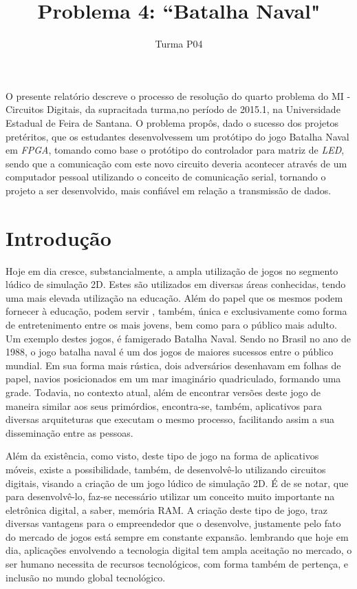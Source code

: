\documentclass[12pt]{article}
\title{Problema 4: ``Batalha Naval"}
\author{Turma P04}
\begin{document}
 

\maketitle

\begin{resumo} 
O presente relatório descreve o processo de resolução do quarto problema do MI - Circuitos Digitais, da supracitada turma,no período de 2015.1, na Universidade Estadual de Feira de Santana. O problema propôs, dado o sucesso dos projetos pretéritos, que os estudantes desenvolvessem um protótipo do jogo Batalha Naval em \textit{FPGA}, tomando como base o  protótipo do controlador para matriz de \textit{LED}, sendo que a comunicação com este novo circuito deveria acontecer através de um computador pessoal utilizando o conceito de comunicação serial, tornando o projeto a ser desenvolvido, mais confiável em relação a transmissão de dados.
\end{resumo}

\section{Introdução}

Hoje em dia cresce, substancialmente, a ampla utilização de jogos no segmento lúdico de simulação 2D. Estes são utilizados em diversas áreas conhecidas, tendo uma mais elevada utilização na educação. Além do papel que os mesmos podem fornecer à educação, podem servir , também, única e exclusivamente como forma de entretenimento entre os mais jovens, bem como para o público mais adulto. Um exemplo destes jogos, é famigerado Batalha Naval. Sendo no Brasil no ano de 1988, o jogo batalha naval é um dos jogos de maiores sucessos entre o público mundial. Em sua forma mais rústica, dois adversários desenhavam em folhas de papel, navios posicionados em um mar imaginário quadriculado, formando uma grade. Todavia, no contexto atual, além de encontrar versões deste jogo de maneira similar aos seus primórdios, encontra-se, também, aplicativos para diversas arquiteturas que executam o mesmo processo, facilitando assim a sua disseminação entre as pessoas.

Além da existência, como visto, deste tipo de jogo na forma de aplicativos móveis, existe a possibilidade, também, de desenvolvê-lo utilizando circuitos digitais, visando a criação de um jogo lúdico de simulação 2D.  É de se notar, que para desenvolvê-lo, faz-se necessário utilizar um conceito muito importante na eletrônica digital, a saber, memória RAM. A criação deste tipo de jogo, traz diversas vantagens para o empreendedor que o desenvolve, justamente pelo fato do mercado de jogos está sempre em constante expansão. lembrando que hoje em dia, aplicações envolvendo a tecnologia digital tem ampla aceitação no mercado, o ser humano necessita de recursos tecnológicos, com forma também de pertença, e inclusão no mundo global tecnológico. 
\end{document}
